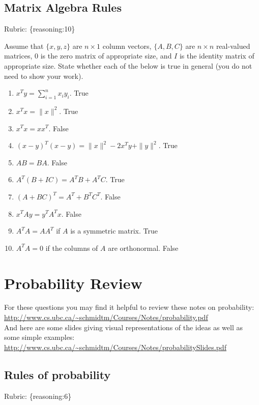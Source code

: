 \documentclass{article}
\def\rubric#1{\gre{Rubric: \{#1\}}}{}
\def\blu#1{{\color{blu}#1}}
\def\gre#1{{\color{gre}#1}}
\def\red#1{{\color{red}#1}}
\def\norm#1{\|#1\|}
\begin{document}
\subsection{Matrix Algebra Rules}
\rubric{reasoning:10}

Assume that $\{x,y,z\}$ are $n \times 1$ column vectors, $\{A,B,C\}$ are $n \times n$ real-valued matrices, \red{$0$ is the zero matrix of appropriate size}, and $I$ is the identity matrix of appropriate size. \blu{State whether each of the below is true in general} (you do not need to show your work).

\begin{enumerate}
\item $x^Ty = \sum_{i=1}^n x_iy_i$. \red{True}
\item $x^Tx = \norm{x}^2$. \red{True}
\item $x^Tx = xx^T$. \red{False}
\item $(x-y)^T(x-y) = \norm{x}^2 - 2x^Ty + \norm{y}^2$. \red{True}
\item $AB=BA$. \red{False}
\item $A^T(B + IC) = A^TB + A^TC$. \red{True}
\item $(A + BC)^T = A^T + B^TC^T$. \red{False}
\item $x^TAy = y^TA^Tx$. \red{False}
\item $A^TA = AA^T$ if $A$ is a symmetric matrix. \red{True}
\item $A^TA = 0$ if the columns of $A$ are orthonormal. \red{False} 
\end{enumerate}

\section{Probability Review}


For these questions you may find it helpful to review these notes on probability:\\
\url{http://www.cs.ubc.ca/~schmidtm/Courses/Notes/probability.pdf}\\
And here are some slides giving visual representations of the ideas as well as some simple examples:\\
\url{http://www.cs.ubc.ca/~schmidtm/Courses/Notes/probabilitySlides.pdf}

\subsection{Rules of probability}
\rubric{reasoning:6}
\end{document}
